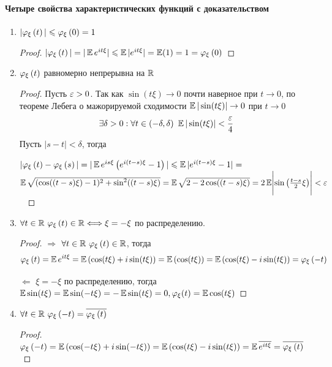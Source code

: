 \paragraph*{Четыре свойства характеристических функций с доказательством}

\begin{enumerate}
    \item $|\varphi_{\xi}\left({t}\right)| \leqslant \varphi_{\xi}\left({0}\right) = 1$
    
    \begin{proof} $|\varphi_{\xi}\left({t}\right)| = |\operatorname{\mathbb{E}} e^{it\xi}| \leqslant \operatorname{\mathbb{E}}|e^{it\xi}| = \operatorname{\mathbb{E}}(1) = 1 = \varphi_{\xi}\left({0}\right)$\end{proof}
    
    \item $\varphi_{\xi}\left({t}\right)$ равномерно непрерывна на $\mathbb{R}$
    
    \begin{proof} Пусть $\varepsilon > 0$. Так как $\sin(t\xi) \to 0$ почти наверное при $t \to 0$, по теореме Лебега о мажорируемой сходимости $\operatorname{\mathbb{E}}|\sin(t\xi)| \to 0$ при $t \to 0$
    $$
    \exists \delta > 0: \forall t \in (-\delta, \delta) \ \operatorname{\mathbb{E}}|\sin(t\xi)| < \frac{\varepsilon}{4}
    $$
    Пусть $|s - t| < \delta$, тогда
    
   $|\varphi_{\xi}\left({t}\right) - \varphi_{\xi}\left({s}\right)| = |\operatorname{\mathbb{E}} e^{is\xi}\left({e^{i(t - s)\xi} - 1}\right)| \leqslant \operatorname{\mathbb{E}}|e^{i(t - s)\xi} - 1| =$ \\ $ \operatorname{\mathbb{E}}\sqrt{(\cos((t - s)\xi) - 1)^2 + \sin^2((t - s)\xi)} =
 \operatorname{\mathbb{E}}\sqrt{2 - 2\cos((t - s)\xi)} = 2\operatorname{\mathbb{E}}\Biggl|\sin\left({\frac{t - s}{2}\xi}\right)\Biggr| < \varepsilon
    $ \ \end{proof}
    
    \item $\forall t \in \mathbb{R} \ \varphi_{\xi}\left({t}\right) \in \mathbb{R} \Longleftrightarrow \xi = -\xi$ по распределению.
    
    \begin{proof} 
    $\Longrightarrow$ 
    $\forall t \in \mathbb{R} \ \varphi_{\xi}\left({t}\right) \in \mathbb{R}$, тогда
    $$
    \varphi_{\xi}\left({t}\right) = \operatorname{\mathbb{E}} e^{it\xi} = \operatorname{\mathbb{E}} \left({\cos(t\xi) + i\sin(t\xi)}\right) = \operatorname{\mathbb{E}} \left({\cos(t\xi)}\right) = \operatorname{\mathbb{E}} \left({\cos(t\xi) - i\sin(t\xi)}\right) = \varphi_{\xi}\left({-t}\right)
    $$
    
    $\Longleftarrow$
    $\xi = -\xi$ по распределению, тогда $\operatorname{\mathbb{E}}\sin(t\xi) = \operatorname{\mathbb{E}}\sin(-t\xi) = -\operatorname{\mathbb{E}}\sin(t\xi) = 0, \varphi_\xi(t) = \operatorname{\mathbb{E}}\cos(t\xi)$  \end{proof}
     
    \item $\forall t \in \mathbb{R} \ \varphi_{\xi}\left({-t}\right) = \overline{\varphi_{\xi}\left({t}\right)}$
    
    \begin{proof} $\varphi_{\xi}\left({-t}\right) = \operatorname{\mathbb{E}}\left({\cos(-t\xi) + i\sin(-t\xi)}\right) = \operatorname{\mathbb{E}}\left({\cos(t\xi) - i\sin(t\xi)}\right) = \operatorname{\mathbb{E}} \overline{e^{it\xi}}  =\overline{\varphi_{\xi}\left({t}\right)}$  \end{proof}
\end{enumerate}

